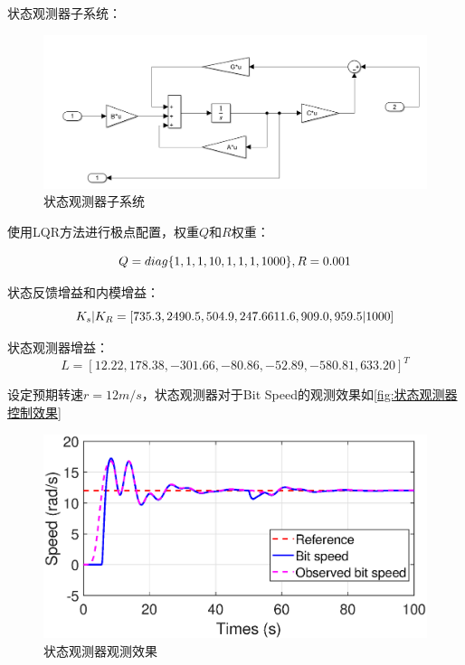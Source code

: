 \documentclass[12pt,hyperref,a4paper,UTF8]{ctexart}
\begin{document}
	状态观测器子系统：
	
	\begin{figure}[!htbp]
		\centering
		\includegraphics[width=0.7\linewidth]{figures/状态观测器子系统}
		\caption{状态观测器子系统}
		\label{fig:状态观测器子系统}
	\end{figure}
	
	使用LQR方法进行极点配置，权重$Q$和$R$权重：
	
	\begin{equation}
		Q = {\rm{ }}diag\{ 1,{\rm{ }}1,{\rm{ }}1,{\rm{ }}10,{\rm{ }}1,{\rm{ }}1,{\rm{ }}1,{\rm{ }}1000\} ,{\rm{ }}R = {\rm{ }}0.001
	\end{equation}
	
	状态反馈增益和内模增益：
	\begin{equation}
		{K_s}|{K_R} = {\rm{ }}[735.3,{\rm{ }}2490.5,{\rm{ }}504.9,{\rm{ }}247.6611.6,{\rm{ }}909.0,{\rm{ }}959.5|1000]
	\end{equation}
	
	状态观测器增益：
	\begin{equation}
		L = [12.22, 178.38, − 301.66,	−80.86, −52.89, − 580.81, 633.20]^T
	\end{equation}
	
	
	\newpage
	设定预期转速$r=12m/s$，状态观测器对于Bit Speed的观测效果如\autoref{fig:状态观测器控制效果}
	
	\begin{figure}[!htbp]
		\centering
		\includegraphics[width=0.7\linewidth]{figures/状态观测器观测效果}
		\caption{状态观测器观测效果}
		\label{fig:状态观测器观测效果}
	\end{figure}
	
\end{document}
